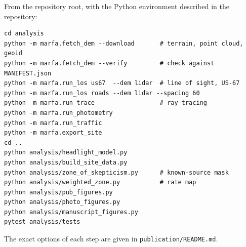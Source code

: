 \documentclass[11pt]{article}
\begin{document}
From the repository root, with the Python environment described in the repository:
\begin{verbatim}
cd analysis
python -m marfa.fetch_dem --download       # terrain, point cloud, geoid
python -m marfa.fetch_dem --verify         # check against MANIFEST.json
python -m marfa.run_los us67  --dem lidar  # line of sight, US-67
python -m marfa.run_los roads --dem lidar --spacing 60
python -m marfa.run_trace                  # ray tracing
python -m marfa.run_photometry
python -m marfa.run_traffic
python -m marfa.export_site
cd ..
python analysis/headlight_model.py
python analysis/build_site_data.py
python analysis/zone_of_skepticism.py      # known-source mask
python analysis/weighted_zone.py           # rate map
python analysis/pub_figures.py
python analysis/photo_figures.py
python analysis/manuscript_figures.py
pytest analysis/tests
\end{verbatim}
The exact options of each step are given in \texttt{publication/README.md}.



\end{document}
